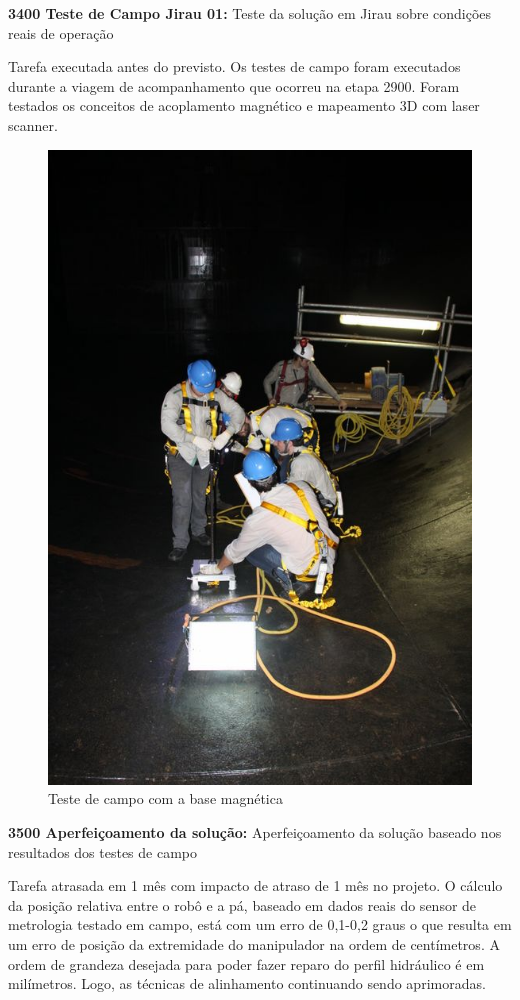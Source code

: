 \textbf{3400 Teste de Campo Jirau 01:} Teste da solução  em Jirau sobre
condições reais de operação

Tarefa executada antes do previsto. Os testes de campo foram executados durante
a viagem de acompanhamento que ocorreu na etapa 2900. Foram testados os
conceitos de acoplamento magnético e mapeamento 3D com laser scanner.

\begin{figure}\centering
\includegraphics[width=0.9\columnwidth]{figs/base}
\caption{Teste de campo com a base  magnética}
\end{figure}

\textbf{3500 Aperfeiçoamento da solução:}
Aperfeiçoamento da solução baseado nos resultados dos testes de campo 

Tarefa atrasada em 1 mês com impacto de atraso de 1 mês no projeto. O cálculo da
posição relativa entre o robô e a pá, baseado em dados reais do sensor de
metrologia testado em campo, está com um erro de 0,1-0,2 graus o que resulta em
um erro de posição da extremidade do manipulador na ordem de centímetros. A
ordem de grandeza desejada para poder fazer reparo do perfil hidráulico é em
milímetros. Logo, as técnicas de alinhamento continuando sendo aprimoradas.

